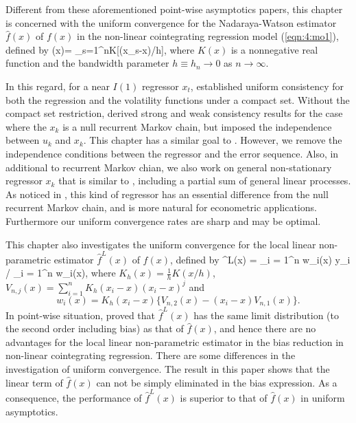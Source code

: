 Different from these aforementioned point-wise asymptotics papers, this chapter is concerned with the uniform convergence for the Nadaraya-Watson estimator $\widehat{f}(x)$ of $f(x)$ in the non-linear cointegrating
regression model (\ref {eqn:4:mo1}), defined by
\be {}(x)=
{\sum_{s=1}^{n}K[(x_{s}-x)/h]},
\ee
where $K(x)$ is a nonnegative real function and  the bandwidth parameter $h\equiv h_n\to 0$ as $n\to\infty$.

 In this regard, for a near $I(1)$ regressor $x_t$, \cite{wangwang2012} established uniform consistency for  both the regression and the volatility functions under  a compact set. Without the compact set restriction,  \cite{gaolitjostheim2011} derived strong and weak consistency results for the case where the $x_k$ is a null recurrent Markov chain,  but  imposed the independence between $u_k$ and $x_k$. This chapter has a similar goal to \cite{gaolitjostheim2011}. However, we remove the independence conditions between the regressor and the error sequence. Also, in additional to recurrent Markov chian, we also work on general non-stationary regressor $x_k$ that is similar to \cite{wangphillips2010a}, including a partial sum of general linear processes. As noticed in \cite{wangphillips2010a}, this kind of regressor has an essential difference from the null recurrent Markov chain, and is more natural for econometric applications. Furthermore  our uniform convergence rates are sharp and may be optimal.

This chapter also investigates the uniform convergence for the local linear non-parametric  estimator $\widehat{f}^L(x)$ of $f(x)$, defined by
\be {}
^L(x) = \sum_{i = 1}^n w_i(x) y_i / \sum_{i = 1}^n w_i(x), \quad
\ee
where $K_h(x) = \frac{1}{h}K(x/h)$, $V_{n, j}(x) =  \sum_{i=1}^n K_h(x_i - x) (x_i - x)^j$
and
$$
w_i(x) = K_h(x_i - x) \{ V_{n,2}(x) - (x_i - x) V_{n,1}(x) \}.
$$
 In point-wise situation, \cite{wangphillips2010b} proved that
 $\widehat{f}^L(x)$ has the same limit distribution (to the second order including bias) as that of   $\widehat{f}(x)$, and hence there are no advantages  for  the local linear non-parametric  estimator in the bias reduction in non-linear cointegrating regression. There are some differences in the investigation of  uniform convergence. The result in this paper shows that the linear term  of $\widehat{f}(x)$
 can not be simply eliminated in the bias expression. As a consequence,   the performance of $\widehat{f}^L(x)$ is superior to that of $\widehat{f}(x)$ in uniform asymptotics.

